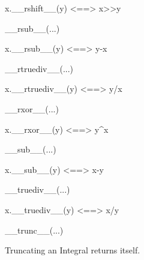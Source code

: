 \documentclass[letterpaper,10pt,english]{sphinxmanual}
\begin{document}
\begin{description}
\begin{description}
\begin{DUlineblock}{0em}
\begin{DUlineblock}{\DUlineblockindent}
\item[] x.\_\_rshift\_\_(y) \textless{}==\textgreater{} x\textgreater{}\textgreater{}y
\item[] 
\end{DUlineblock}
\item[] \_\_rsub\_\_(...)
\item[]
\begin{DUlineblock}{\DUlineblockindent}
\item[] x.\_\_rsub\_\_(y) \textless{}==\textgreater{} y-x
\item[] 
\end{DUlineblock}
\item[] \_\_rtruediv\_\_(...)
\item[]
\begin{DUlineblock}{\DUlineblockindent}
\item[] x.\_\_rtruediv\_\_(y) \textless{}==\textgreater{} y/x
\item[] 
\end{DUlineblock}
\item[] \_\_rxor\_\_(...)
\item[]
\begin{DUlineblock}{\DUlineblockindent}
\item[] x.\_\_rxor\_\_(y) \textless{}==\textgreater{} y\textasciicircum{}x
\item[] 
\end{DUlineblock}
\item[] \_\_sub\_\_(...)
\item[]
\begin{DUlineblock}{\DUlineblockindent}
\item[] x.\_\_sub\_\_(y) \textless{}==\textgreater{} x-y
\item[] 
\end{DUlineblock}
\item[] \_\_truediv\_\_(...)
\item[]
\begin{DUlineblock}{\DUlineblockindent}
\item[] x.\_\_truediv\_\_(y) \textless{}==\textgreater{} x/y
\item[] 
\end{DUlineblock}
\item[] \_\_trunc\_\_(...)
\item[]
\begin{DUlineblock}{\DUlineblockindent}
\item[] Truncating an Integral returns itself.
\item[] 
\end{DUlineblock}

\end{DUlineblock}
\end{description}
\end{description}
\end{document}

